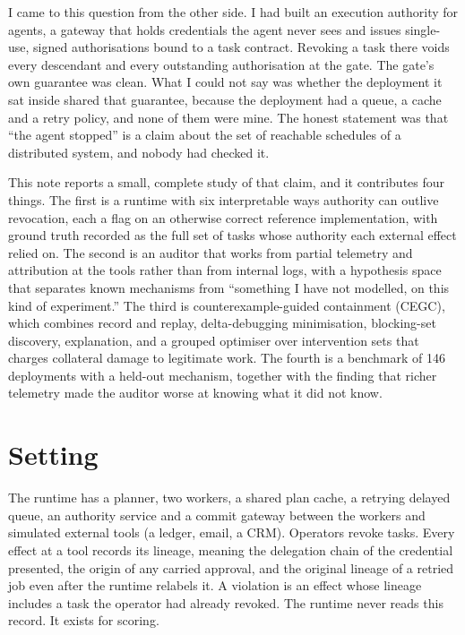 \documentclass[10pt]{article}
\begin{document}
I came to this question from the other side. I had built an execution authority for agents, a gateway that holds credentials the agent never sees and issues single-use, signed authorisations bound to a task contract. Revoking a task there voids every descendant and every outstanding authorisation at the gate. The gate's own guarantee was clean. What I could not say was whether the deployment it sat inside shared that guarantee, because the deployment had a queue, a cache and a retry policy, and none of them were mine. The honest statement was that ``the agent stopped'' is a claim about the set of reachable schedules of a distributed system, and nobody had checked it.

This note reports a small, complete study of that claim, and it contributes four things. The first is a runtime with six interpretable ways authority can outlive revocation, each a flag on an otherwise correct reference implementation, with ground truth recorded as the full set of tasks whose authority each external effect relied on. The second is an auditor that works from partial telemetry and attribution at the tools rather than from internal logs, with a hypothesis space that separates known mechanisms from ``something I have not modelled, on this kind of experiment.'' The third is counterexample-guided containment (CEGC), which combines record and replay, delta-debugging minimisation, blocking-set discovery, explanation, and a grouped optimiser over intervention sets that charges collateral damage to legitimate work. The fourth is a benchmark of 146 deployments with a held-out mechanism, together with the finding that richer telemetry made the auditor worse at knowing what it did not know.

\section{Setting}
The runtime has a planner, two workers, a shared plan cache, a retrying delayed queue, an authority service and a commit gateway between the workers and simulated external tools (a ledger, email, a CRM). Operators revoke tasks. Every effect at a tool records its lineage, meaning the delegation chain of the credential presented, the origin of any carried approval, and the original lineage of a retried job even after the runtime relabels it. A violation is an effect whose lineage includes a task the operator had already revoked. The runtime never reads this record. It exists for scoring.
\end{document}
